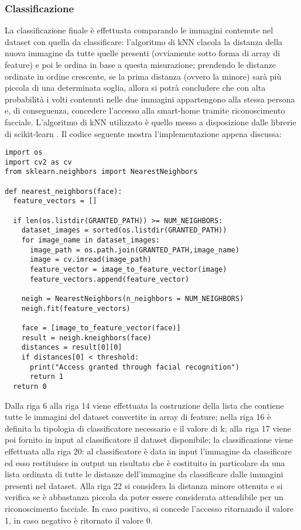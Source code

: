 \subsubsection{Classificazione}
La classificazione finale è effettuata comparando le immagini contenute nel dataset con quella da classificare: l'algoritmo di kNN clacola la distanza della nuova immagine da tutte quelle presenti (ovviamente sotto forma di array di feature) e poi le ordina in base a questa misurazione; prendendo le distanze ordinate in ordine crescente, se la prima distanza (ovvero la minore) sarà più piccola di una determinata soglia, allora si potrà concludere che con alta probabilità i volti contenuti nelle due immagini appartengono alla stessa persona e, di conseguenza, concedere l'accesso alla smart-home tramite riconoscimento facciale. L'algoritmo di kNN utilizzato è quello messo a disposizione dalle librerie di scikit-learn \cite{scikit-learn}. Il codice seguente mostra l'implementazione appena discussa:
\begin{lstlisting}
import os
import cv2 as cv
from sklearn.neighbors import NearestNeighbors

def nearest_neighbors(face):
  feature_vectors = []

  if len(os.listdir(GRANTED_PATH)) >= NUM_NEIGHBORS:
    dataset_images = sorted(os.listdir(GRANTED_PATH))
    for image_name in dataset_images:
      image_path = os.path.join(GRANTED_PATH,image_name)
      image = cv.imread(image_path)
      feature_vector = image_to_feature_vector(image)
      feature_vectors.append(feature_vector)

    neigh = NearestNeighbors(n_neighbors = NUM_NEIGHBORS)
    neigh.fit(feature_vectors)

    face = [image_to_feature_vector(face)]
    result = neigh.kneighbors(face)
    distances = result[0][0]
    if distances[0] < threshold:
      print("Access granted through facial recognition")
      return 1
  return 0
\end{lstlisting}
Dalla riga 6 alla riga 14 viene effettuata la costruzione della lista che contiene tutte le immagini del dataset convertite in array di feature; nella riga 16 è definita la tipologia di classificatore necessario e il valore di k; alla riga 17 viene poi fornito in input al classificatore il dataset disponibile; la classificazione viene effettuata alla riga 20: al classificatore è data in input l'immagine da classificare ed esso restituisce in output un risultato che è costituito in particolare da una lista ordinata di tutte le distanze dell'immagine da classificare dalle immagini presenti nel dataset. Alla riga 22 si considera la distanza minore ottenuta e si verifica se è abbastanza piccola da poter essere considerata attendibile per un riconoscimento facciale. In caso positivo, si concede l'accesso ritornando il valore 1, in caso negativo è ritornato il valore 0.

